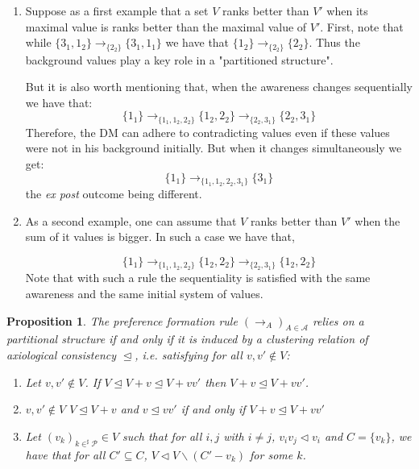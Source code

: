 \documentclass[11pt]{article}
\newtheorem{proposition}{Proposition}
\begin{document}
\begin{enumerate}
\item  Suppose as a first example that a set $V$ ranks better than $V'$ when its maximal value is ranks better than the maximal value of $V'$. First, note that while $\{3_1, 1_2\}\rightarrow_{\{2_2\}}\{3_1, 1_1\}$
we have that $\{1_2\}\rightarrow_{\{2_2\}}\{2_2\}$. Thus the background values play a key role in a "partitioned structure". 

But it is also worth mentioning that, when the awareness changes sequentially we have that:
\begin{equation*}
\{1_1\}\rightarrow_{\{1_1,1_2,2_2\}}\{1_2,2_2\}\rightarrow_{\{2_2,3_1\}}\{2_2,3_1\}
\end{equation*} 
Therefore, the DM can adhere to contradicting values even if these values were not in his background initially. But when it changes simultaneously we get:
\begin{equation*}
\{1_1\}\rightarrow_{\{1_1,1_2,2_2,3_1\}}\{3_1\}
\end{equation*}
the \textit{ex post} outcome being different. 
\item As a second example, one can assume that $V$ ranks better than $V'$ when the sum of it values is bigger. In such a case we have that, 

\begin{equation*}
\{1_1\}\rightarrow_{\{1_1,1_2,2_2\}}\{1_2,2_2\}\rightarrow_{\{2_2,3_1\}}\{1_2,2_2\}
\end{equation*} 
Note that with such a rule the sequentiality is satisfied with the same awareness and the same initial system of values. 
\end{enumerate}



\begin{proposition} The preference formation rule $(\rightarrow_A)_{A\in\mathcal{A}}$ relies on a partitional structure if and only if it is induced by a clustering relation of axiological consistency $\trianglelefteq$, i.e. satisfying for all $v,v'\not\in V$:
\begin{enumerate}
\item Let $v,v'\not\in V$. If $V\trianglelefteq V+v\trianglelefteq V+vv'$ then $V+v\trianglelefteq V+vv'$. 
\item $v,v'\not\in V$ $V\trianglelefteq V+v$ and $v\trianglelefteq vv'$ if and only if $V+v \trianglelefteq V+vv'$
\item Let $(v_k)_{k\in^\sharp\mathcal{P}}\in V$ such that for all $i,j$ with $i\not=j$, $v_iv_j\triangleleft v_i$ and $C=\{v_k\}$, we have that for all $C'\subseteq C$, $V\triangleleft V\backslash (C'-v_k)$ for some $k$.  
\end{enumerate}
\end{proposition}
\end{document}
